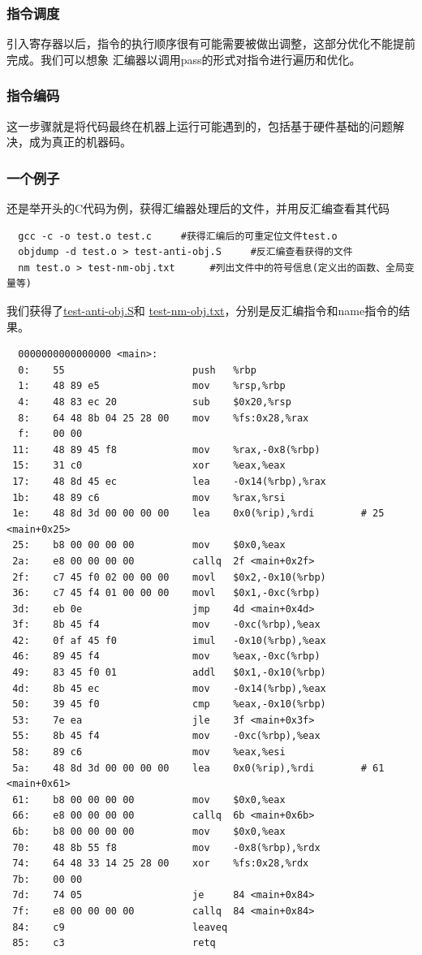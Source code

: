 \documentclass[UTF8,a4paper,10pt]{ctexart}
\begin{document}
\subsubsection{指令调度}
引入寄存器以后，指令的执行顺序很有可能需要被做出调整，这部分优化不能提前完成。我们可以想象
汇编器以调用pass的形式对指令进行遍历和优化。

\subsubsection{指令编码}
这一步骤就是将代码最终在机器上运行可能遇到的，包括基于硬件基础的问题解决，成为真正的机器码。

\subsubsection{一个例子}
还是举开头的C代码为例，获得汇编器处理后的文件，并用反汇编查看其代码
\begin{lstlisting}
  gcc -c -o test.o test.c     #获得汇编后的可重定位文件test.o
  objdump -d test.o > test-anti-obj.S     #反汇编查看获得的文件
  nm test.o > test-nm-obj.txt      #列出文件中的符号信息(定义出的函数、全局变量等)
\end{lstlisting}
我们获得了\href{run:./test/test-anti-obj.S}{test-anti-obj.S}和
\href{run:./test/test-nm-obj.txt}{test-nm-obj.txt}，分别是反汇编指令和name指令的结果。
\begin{lstlisting}
  0000000000000000 <main>:
  0:	55                   	push   %rbp
  1:	48 89 e5             	mov    %rsp,%rbp
  4:	48 83 ec 20          	sub    $0x20,%rsp
  8:	64 48 8b 04 25 28 00 	mov    %fs:0x28,%rax
  f:	00 00 
 11:	48 89 45 f8          	mov    %rax,-0x8(%rbp)
 15:	31 c0                	xor    %eax,%eax
 17:	48 8d 45 ec          	lea    -0x14(%rbp),%rax
 1b:	48 89 c6             	mov    %rax,%rsi
 1e:	48 8d 3d 00 00 00 00 	lea    0x0(%rip),%rdi        # 25 <main+0x25>
 25:	b8 00 00 00 00       	mov    $0x0,%eax
 2a:	e8 00 00 00 00       	callq  2f <main+0x2f>
 2f:	c7 45 f0 02 00 00 00 	movl   $0x2,-0x10(%rbp)
 36:	c7 45 f4 01 00 00 00 	movl   $0x1,-0xc(%rbp)
 3d:	eb 0e                	jmp    4d <main+0x4d>
 3f:	8b 45 f4             	mov    -0xc(%rbp),%eax
 42:	0f af 45 f0          	imul   -0x10(%rbp),%eax
 46:	89 45 f4             	mov    %eax,-0xc(%rbp)
 49:	83 45 f0 01          	addl   $0x1,-0x10(%rbp)
 4d:	8b 45 ec             	mov    -0x14(%rbp),%eax
 50:	39 45 f0             	cmp    %eax,-0x10(%rbp)
 53:	7e ea                	jle    3f <main+0x3f>
 55:	8b 45 f4             	mov    -0xc(%rbp),%eax
 58:	89 c6                	mov    %eax,%esi
 5a:	48 8d 3d 00 00 00 00 	lea    0x0(%rip),%rdi        # 61 <main+0x61>
 61:	b8 00 00 00 00       	mov    $0x0,%eax
 66:	e8 00 00 00 00       	callq  6b <main+0x6b>
 6b:	b8 00 00 00 00       	mov    $0x0,%eax
 70:	48 8b 55 f8          	mov    -0x8(%rbp),%rdx
 74:	64 48 33 14 25 28 00 	xor    %fs:0x28,%rdx
 7b:	00 00 
 7d:	74 05                	je     84 <main+0x84>
 7f:	e8 00 00 00 00       	callq  84 <main+0x84>
 84:	c9                   	leaveq 
 85:	c3                   	retq  
\end{lstlisting}
\end{document}

